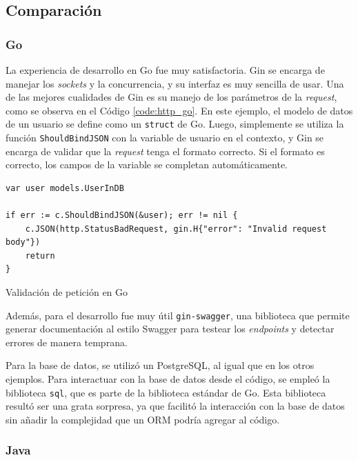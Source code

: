 \documentclass[11pt]{article}
\let\Oldsubsection\subsection
\renewcommand{\subsection}{\FloatBarrier\Oldsubsection}
\let\Oldsubsubsection\subsubsection
\renewcommand{\subsubsection}{\FloatBarrier\Oldsubsubsection}
\newcommand{\english}[1]{\textit{#1}}
\begin{document}
\subsection{Comparación}

\subsubsection{Go}

La experiencia de desarrollo en Go fue muy satisfactoria. Gin se encarga de manejar los \english{sockets} y la concurrencia, y su interfaz es muy sencilla de usar. Una de las mejores cualidades de Gin es su manejo de los parámetros de la \english{request}, como se observa en el Código \ref{code:http_go}. En este ejemplo, el modelo de datos de un usuario se define como un \lstinline{struct} de Go. Luego, simplemente se utiliza la función \lstinline{ShouldBindJSON} con la variable de usuario en el contexto, y Gin se encarga de validar que la \english{request} tenga el formato correcto. Si el formato es correcto, los campos de la variable se completan automáticamente.

\begin{listing}
\begin{verbatim}
var user models.UserInDB

if err := c.ShouldBindJSON(&user); err != nil {
	c.JSON(http.StatusBadRequest, gin.H{"error": "Invalid request body"})
	return
}
\end{verbatim}
\caption{Validación de petición en Go}
\label{code:http_go}
\end{listing}

Además, para el desarrollo fue muy útil \lstinline{gin-swagger}, una biblioteca que permite generar documentación al estilo Swagger para testear los \english{endpoints} y detectar errores de manera temprana.

Para la base de datos, se utilizó un PostgreSQL, al igual que en los otros ejemplos. Para interactuar con la base de datos desde el código, se empleó la biblioteca \lstinline{sql}, que es parte de la biblioteca estándar de Go. Esta biblioteca resultó ser una grata sorpresa, ya que facilitó la interacción con la base de datos sin añadir la complejidad que un ORM podría agregar al código.


\subsubsection{Java}
\end{document}
